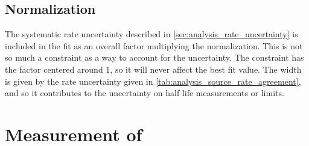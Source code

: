 \documentclass[herrin-thesis.tex]{subfiles}
\begin{document}
\subsection{Normalization}
The systematic rate uncertainty described in \cref{sec:analysis_rate_uncertainty} is included in the fit as an overall factor multiplying the normalization. This is not so much a constraint as a way to account for the uncertainty. The constraint has the factor centered around 1, so it will never affect the best fit value. The width is given by the rate uncertainty given in \cref{tab:analysis_source_rate_agreement}, and so it contributes to the uncertainty on half life measurements or limits.

\section{Measurement of \twonu}
\end{document}

